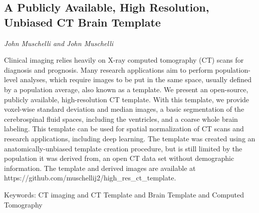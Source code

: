\documentclass[../booklet.tex]{subfiles}
\begin{document}
\subsection[A Publicly Available, High Resolution, Unbiased CT Brain Template. {\it John Muschelli and John Muschelli}]{A Publicly Available, High Resolution, Unbiased CT Brain Template}
 

\begin{center}
  {\it John Muschelli and John Muschelli}
\end{center}

\vskip 0.8cm


  Clinical imaging relies heavily on X-ray computed tomography (CT) scans for diagnosis and prognosis. Many research applications aim to perform population-level analyses, which require images to be put in the same space, usually defined by a population average, also known as a template. We present an open-source, publicly available, high-resolution CT template. With this template, we provide voxel-wise standard deviation and median images, a basic segmentation of the cerebrospinal fluid spaces, including the ventricles, and a coarse whole brain labeling. This template can be used for spatial normalization of CT scans and research applications, including deep learning. The template was created using an anatomically-unbiased template creation procedure, but is still limited by the population it was derived from, an open CT data set without demographic information. The template and derived images are available at https://github.com/muschellij2/high\_res\_ct\_template.

  Keywords: CT imaging and CT Template and Brain Template and Computed Tomography
  
\end{document}
